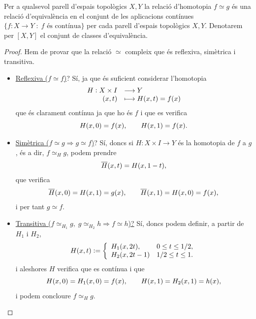 \documentclass[../main.tex]{subfiles}
\begin{document}
\begin{prop}
[Exercici 1.1]\label{exercici1.1} Per a qualsevol parell d'espais topològics $X,Y$ la relació d'homotopia $f\simeq g$ és una relació d'equivalència en el conjunt de les aplicacions contínues $\{f:X\rightarrow Y\;:\;f\text{ és contínua}\}$ per cada parell d'espais topològics $X,Y$. Denotarem per $[X,Y]$ el conjunt de classes d'equivalència.
\end{prop}
\begin{proof}
Hem de provar que la relació $\simeq$ compleix que és reflexiva, simètrica i transitiva.
\begin{itemize}
    \item \underline{Reflexiva ($f\simeq f$)}? Sí, ja que és suficient considerar l'homotopia
    \begin{equation}
        \notag
        \begin{array}{rl}
            H:X\times I & \longrightarrow Y \\
            (x,t) & \longmapsto H(x,t) = f(x)
        \end{array}
    \end{equation}
    que és clarament contínua ja que ho és $f$ i que es verifica
    \begin{equation}
        \notag
        H(x,0) = f(x),\qquad H(x,1) = f(x).
    \end{equation}
    
    \item \underline{Simètrica ($f\simeq g \Rightarrow g\simeq f$)}? Sí, doncs si $H:X\times I\rightarrow Y$ és la homotopia de $f$ a $g$, és a dir, $f\simeq_H g$, podem prendre
    \begin{equation}
        \notag
        \overline{H}(x,t) = H(x,1-t),
    \end{equation}
    que verifica
    \begin{equation}
        \notag
        \overline{H}(x,0)=H(x,1) = g(x),\qquad \overline{H}(x,1) = H(x,0) = f(x),
    \end{equation}
    i per tant $g\simeq f$.
    
    \item \underline{Transitiva ($f\simeq_{H_1}g,\;g\simeq_{H_2}h\Rightarrow f\simeq h$)?} Sí, doncs podem definir, a partir de $H_1$ i $H_2$,
    \begin{equation}
        \notag
        H(x,t):=\left\{
        \begin{array}{ll}
            H_1(x,2t), & 0\leq t\leq 1/2,\\
            H_2(x,2t-1)& 1/2\leq t\leq 1.
        \end{array}
        \right.
    \end{equation}
    i aleshores $H$ verifica que es contínua i que
    \begin{equation}
        \notag
        H(x,0) =H_1(x,0)=f(x),\qquad H(x,1) = H_2(x,1) = h(x),
    \end{equation}
    i podem concloure $f\simeq_H g$.
\end{itemize}
\end{proof}
\end{document}
